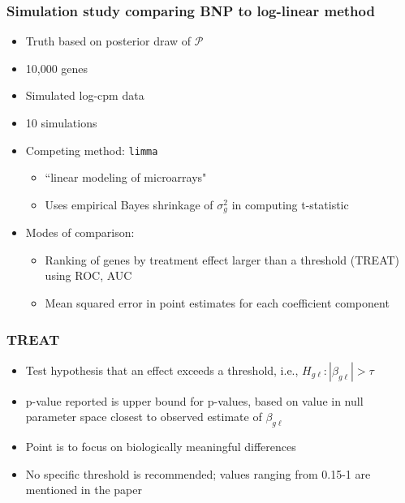 \documentclass{beamer}
\begin{document}
\begin{frame}
  \frametitle{Simulation study comparing BNP to log-linear method}
  \begin{itemize}
    \item Truth based on posterior draw of $\mathcal{P}$
    \item 10,000 genes
    \item Simulated log-cpm data
    \item 10 simulations
    \item Competing method: \texttt{limma} \citep{ritchie2015limma}
    \begin{itemize}
      \item ``linear modeling of microarrays"
      \item Uses empirical Bayes shrinkage of $\sigma^2_g$ in computing t-statistic
    \end{itemize}
    \item Modes of comparison:
    \begin{itemize}
      \item Ranking of genes by treatment effect larger than a threshold (TREAT) using ROC, AUC
      \item Mean squared error in point estimates for each coefficient component
    \end{itemize}
  \end{itemize}
\end{frame}

\begin{frame}
  \frametitle{TREAT}
  \begin{itemize}
    \pause\item Test hypothesis that an effect exceeds a threshold, i.e., $H_{g\ell}: |\beta_{g \ell}|>\tau$
    \pause\item p-value reported is upper bound for p-values, based on value in null parameter space closest to observed estimate of $\beta_{g\ell}$
    \pause\item Point is to focus on biologically meaningful differences
    \pause\item No specific threshold is recommended; values ranging from 0.15-1 are mentioned in the paper
  \end{itemize}
  \citep{treat}
\end{frame}
\end{document}
